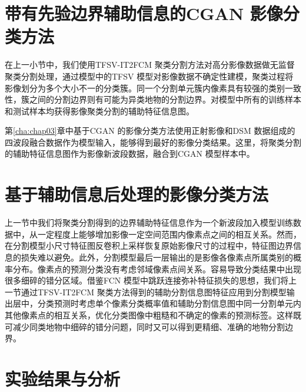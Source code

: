 \section{带有先验边界辅助信息的CGAN 影像分类方法}
\label{sec::chap04-4}

在上一小节中，我们使用TFSV-IT2FCM 聚类分割方法对高分影像数据做无监督聚类分割处理，通过模型中的TFSV 模型对影像数据不确定性建模，聚类过程将影像划分为多个大小不一的分类簇。同一个分割单元簇内像素具有较强的类别一致性，簇之间的分割边界则有可能为异类地物的分割边界。对模型中所有的训练样本和测试样本均获得影像聚类分割的辅助特征信息图。

第\ref{cha:chap03}章中基于CGAN 的影像分类方法使用正射影像和DSM 数据组成的四波段融合数据作为模型输入，能够得到最好的影像分类结果。这里，将聚类分割的辅助特征信息图作为影像新波段数据，融合到CGAN 模型样本中。


\section{基于辅助信息后处理的影像分类方法}
\label{sec::chap04-4}
上一节中我们将聚类分割得到的边界辅助特征信息作为一个新波段加入模型训练数据中，从一定程度上能够增加影像一定空间范围内像素点之间的相互关系。然而，在分割模型小尺寸特征图反卷积上采样恢复原始影像尺寸的过程中，特征图边界信息的损失难以避免。此外，分割模型最后一层输出的是影像各像素点所属类别的概率分布。像素点的预测分类没有考虑邻域像素点间关系。容易导致分类结果中出现很多细碎的错分区域。借鉴FCN 模型中跳跃连接弥补特征损失的思想，我们将上一节通过TFSV-IT2FCM 聚类方法得到的辅助分割信息图特征应用到分割模型输出层中，分类预测时考虑单个像素分类概率值和辅助分割信息图中同一分割单元内其他像素点的相互关系，优化分类图像中粗糙和不确定的像素的预测标签。这样既可减少同类地物中细碎的错分问题，同时又可以得到更精细、准确的地物分割边界。




\section{实验结果与分析}
\label{sec::chap04-5}

